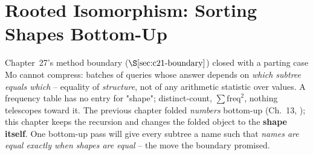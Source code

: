 \section{Rooted Isomorphism: Sorting Shapes Bottom-Up}\label{sec:c22-ahu}

\begin{previouslybox}
Chapter~27's method boundary (\(\secref{c21-boundary}\)) closed with a parting
case Mo cannot compress: batches of queries whose answer depends on
\emph{which subtree equals which} -- equality of \emph{structure}, not of any
arithmetic statistic over values.  A frequency table has no entry for "shape";
distinct-count, \(\sum\mathrm{freq}^2\), nothing telescopes toward it.  The
previous chapter folded \emph{numbers} bottom-up (Ch.~13, ); this
chapter keeps the recursion and changes the folded object to the
\textbf{shape itself}.  One bottom-up pass will give every subtree a name such
that \emph{names are equal exactly when shapes are equal} -- the move the
boundary promised.
\end{previouslybox}

